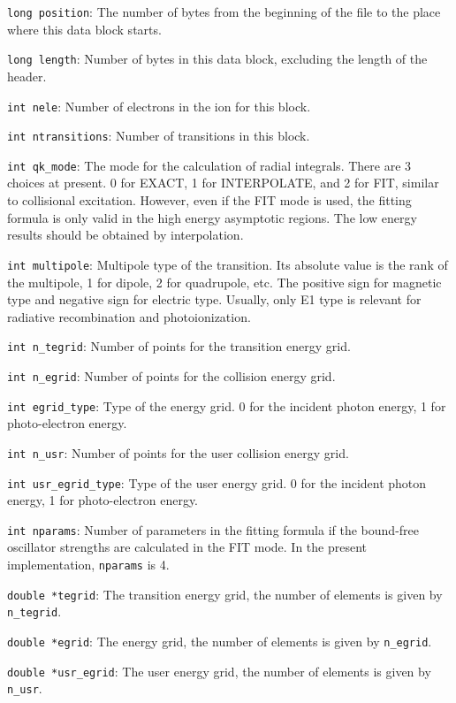 \begin{dbdesc}
\item[\texttt{long position}:] The number of bytes from the beginning of the
file to the place where this data block starts.
\item[\texttt{long length}:] Number of bytes in this data block, excluding the
length of the header.
\item[\texttt{int nele}:] Number of electrons in the ion for this block.
\item[\texttt{int ntransitions}:] Number of transitions in this block.
\item[\texttt{int qk\_mode}:] The mode for the calculation of radial
integrals. There are 3 choices at present. 0 for EXACT, 1 for INTERPOLATE, and
2 for FIT, similar to collisional excitation. However, even if the FIT
mode is used, the fitting formula is only valid in the high energy asymptotic
regions. The low energy results should be obtained by interpolation.
\item[\texttt{int multipole}:] Multipole type of the transition. Its absolute
value is the rank of the multipole, 1 for dipole, 2 for quadrupole, etc. The
positive sign for magnetic type and negative sign for electric type. Usually,
only E1 type is relevant for radiative recombination and photoionization.
\item[\texttt{int n\_tegrid}:] Number of points for the transition energy grid.
\item[\texttt{int n\_egrid}:] Number of points for the collision energy grid.
\item[\texttt{int egrid\_type}:] Type of the energy grid. 0 for the incident
photon energy, 1 for photo-electron energy.
\item[\texttt{int n\_usr}:] Number of points for the user collision energy
grid.
\item[\texttt{int usr\_egrid\_type}:] Type of the user energy grid. 0 for the
incident photon energy, 1 for photo-electron energy.
\item[\texttt{int nparams}:] Number of parameters in the fitting formula if the
bound-free oscillator strengths are calculated in the FIT mode. In the present
implementation, \texttt{nparams} is 4.
\item[\texttt{double *tegrid}:] The transition energy grid, the number of
elements is given by \texttt{n\_tegrid}.
\item[\texttt{double *egrid}:] The energy grid, the number of elements is
given by \texttt{n\_egrid}.
\item[\texttt{double *usr\_egrid}:] The user energy grid, the number of
elements is given by \texttt{n\_usr}.
\end{dbdesc}

